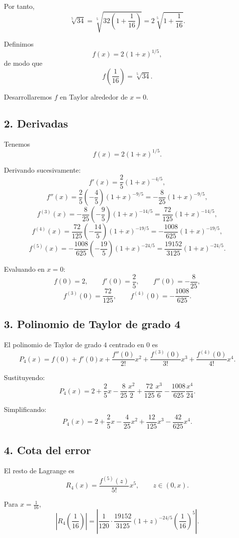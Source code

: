 \documentclass[12pt]{article}
\begin{document}
Por tanto,
\[
\sqrt[5]{34}
=
\sqrt[5]{32\left(1+\frac{1}{16}\right)}
=
2\sqrt[5]{1+\frac{1}{16}}.
\]

Definimos
\[
f(x)=2(1+x)^{1/5},
\]
de modo que
\[
f\left(\frac{1}{16}\right)=\sqrt[5]{34}.
\]

Desarrollaremos \(f\) en Taylor alrededor de \(x=0\).

\subsection*{2. Derivadas}

Tenemos
\[
f(x)=2(1+x)^{1/5}.
\]

Derivando sucesivamente:
\[
f'(x)=\frac{2}{5}(1+x)^{-4/5},
\]
\[
f''(x)=\frac{2}{5}\left(-\frac{4}{5}\right)(1+x)^{-9/5}
=
-\frac{8}{25}(1+x)^{-9/5},
\]
\[
f^{(3)}(x)
=
-\frac{8}{25}\left(-\frac{9}{5}\right)(1+x)^{-14/5}
=
\frac{72}{125}(1+x)^{-14/5},
\]
\[
f^{(4)}(x)
=
\frac{72}{125}\left(-\frac{14}{5}\right)(1+x)^{-19/5}
=
-\frac{1008}{625}(1+x)^{-19/5},
\]
\[
f^{(5)}(x)
=
-\frac{1008}{625}\left(-\frac{19}{5}\right)(1+x)^{-24/5}
=
\frac{19152}{3125}(1+x)^{-24/5}.
\]

Evaluando en \(x=0\):
\[
f(0)=2,
\qquad
f'(0)=\frac{2}{5},
\qquad
f''(0)=-\frac{8}{25},
\]
\[
f^{(3)}(0)=\frac{72}{125},
\qquad
f^{(4)}(0)=-\frac{1008}{625}.
\]

\subsection*{3. Polinomio de Taylor de grado 4}

El polinomio de Taylor de grado \(4\) centrado en \(0\) es
\[
P_4(x)
=
f(0)+f'(0)x+\frac{f''(0)}{2!}x^2+\frac{f^{(3)}(0)}{3!}x^3+\frac{f^{(4)}(0)}{4!}x^4.
\]

Sustituyendo:
\[
P_4(x)
=
2+\frac{2}{5}x-\frac{8}{25}\frac{x^2}{2}+\frac{72}{125}\frac{x^3}{6}-\frac{1008}{625}\frac{x^4}{24}.
\]

Simplificando:
\[
P_4(x)
=
2+\frac{2}{5}x-\frac{4}{25}x^2+\frac{12}{125}x^3-\frac{42}{625}x^4.
\]

\subsection*{4. Cota del error}

El resto de Lagrange es
\[
R_4(x)=\frac{f^{(5)}(z)}{5!}x^5,
\qquad z\in(0,x).
\]

Para \(x=\frac{1}{16}\),
\[
\left|R_4\left(\frac{1}{16}\right)\right|
=
\left|
\frac{1}{120}\cdot \frac{19152}{3125}(1+z)^{-24/5}\left(\frac{1}{16}\right)^5
\right|.
\]
\end{document}
